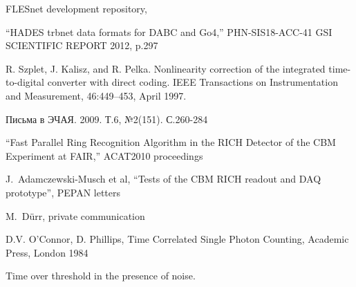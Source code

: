 \begin{thebibliography}{99}

FLESnet development repository,

``HADES trbnet data formats for DABC and Go4,''
PHN-SIS18-ACC-41
GSI SCIENTIFIC REPORT 2012, p.297

R. Szplet, J. Kalisz, and R. Pelka. Nonlinearity correction of the integrated time-to-digital converter with direct coding. IEEE Transactions on Instrumentation and Measurement, 46:449–453, April 1997.

Письма в ЭЧАЯ. 2009. Т.6, №2(151). С.260-284

``Fast Parallel Ring Recognition Algorithm in the RICH Detector of the CBM Experiment at FAIR,''
ACAT2010 proceedings


J.~Adamczewski-Musch et al,
``Tests of the CBM RICH readout and DAQ prototype'',
PEPAN letters

M.~D\"urr, private communication

D.V. O’Connor, D. Phillips, Time Correlated Single Photon Counting, Academic Press, London 1984

Time over threshold in the presence of noise.


\end{thebibliography}
